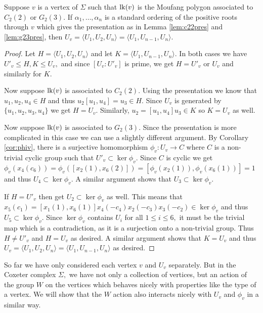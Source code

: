 \documentclass[class=book, crop=false,12 pt]{standalone}
\begin{document}
\begin{lemma}
	\label{lem:generators}
	Suppose $v$ is a vertex of $\Sigma$ such that $\mathrm{lk}(v)$ is the Moufang polygon associated to $C_2(2)$ or $G_2(3).$ If $\alpha_1,\dots,\alpha_n$ is a standard ordering of the positive roots through $v$ which gives the presentation as in Lemma \ref{lem:c22pres} and \ref{lem:g23pres}, then $U_v=\langle U_1,U_2,U_n\rangle=\langle U_1,U_{n-1},U_n\rangle.$
\end{lemma}
\begin{proof}
	Let $H=\langle U_1,U_{2},U_n\rangle$ and let $K=\langle U_1,U_{n-1},U_n\rangle.$ In both cases we have $U'_v\le H,K\le U_v,$ and since $[U_v:U'_v]$ is prime, we get $H=U'_v$ or $U_v$ and similarly for $K.$

	Now suppose $\mathrm{lk}(v)$ is associated to $C_2(2).$ Using the presentation we know that $u_1,u_2,u_4\in H$ and thus $u_2[u_1,u_4]=u_3\in H.$ Since $U_v$ is generated by $\{u_1,u_2,u_3,u_4\}$ we get $H=U_v.$ Similarly, $u_2=[u_1,u_4]u_3\in K$ so $K=U_v$ as well.

	Now suppose $\mathrm{lk}(v)$ is associated to $G_2(3).$ Since the presentation is more complicated in this case we can use a slightly different argument. By Corollary \ref{cor:phiv}, there is a surjective homomorphism $\phi_v:U_v\to C$ where $C$ is a non-trivial cyclic group such that $U'_v\subset \ker \phi_v.$ Since $C$ is cyclic we get $\phi_v(x_4(c_6))=\phi_v([x_2(1),x_6(2)])=[\phi_v(x_2(1)),\phi_v(x_6(1))]=1$ and thus $U_4\subset \ker \phi_v.$ A similar argument shows that $U_3\subset \ker \phi_v.$

	If $H=U'_v$ then get $U_2\subset \ker \phi_v$ as well. This means that $x_5(c_1)=[x_1(1),x_6(1)]x_4(-c_4)x_2(-c_3)x_3(-c_2)\in \ker \phi_v$ and thus $U_5\subset \ker \phi_v.$ Since $\ker \phi_v$ contains $U_i$ for all $1\le i\le 6,$ it must be the trivial map which is a contradiction, as it is a surjection onto a non-trivial group. Thus $H\neq U'_v$ and $H=U_v$ as desired. A similar argument shows that $K=U_v$ and thus $U_v=\langle U_1,U_2,U_n\rangle=\langle U_1,U_{n-1},U_n\rangle$ as desired.
\end{proof}

So far we have only considered each vertex $v$ and $U_v$ separately. But in the Coxeter complex $\Sigma,$ we have not only a collection of vertices, but an action of the group $W$ on the vertices which behaves nicely with properties like the type of a vertex. We will show that the $W$ action also interacts nicely with $U_v$ and $\phi_v$ in a similar way.
\end{document}
